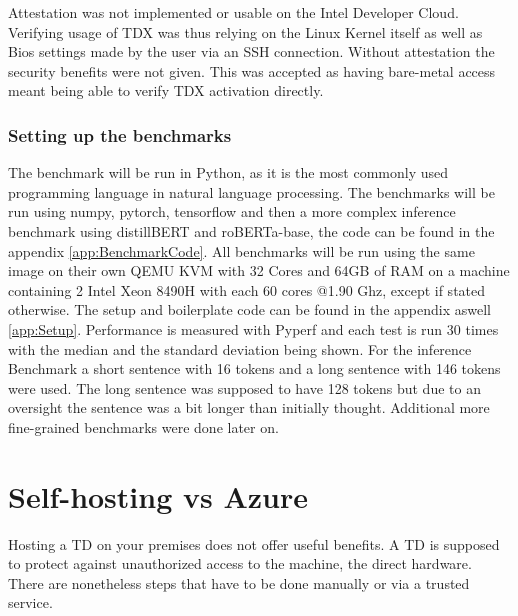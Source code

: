 Attestation was not implemented or usable on the Intel Developer Cloud. Verifying usage of TDX was thus relying on the Linux Kernel itself as well as Bios settings made by the user via an SSH connection. Without attestation the security benefits were not given. This was accepted as having bare-metal access meant being able to verify TDX activation directly.


\subsection{Setting up the benchmarks}
\label{sec:SecondContent:SecondSection}

The benchmark will be run in Python, as it is the most commonly used programming language in natural language processing. The benchmarks will be run using numpy\cite{numpyWeb}, pytorch\cite{pytorchWeb}, tensorflow\cite{tensorflowWeb} and then a more complex inference benchmark using distillBERT and roBERTa-base, the code can be found in the appendix \ref{app:BenchmarkCode}. All benchmarks will be run using the same image on their own QEMU KVM with 32 Cores and 64GB of RAM on a machine containing 2 Intel Xeon 8490H with each 60 cores @1.90 Ghz, except if stated otherwise. The setup and boilerplate code can be found in the appendix aswell \ref{app:Setup}. Performance is measured with Pyperf and each test is run 30 times with the median and the standard deviation being shown.
For the inference Benchmark a short sentence with 16 tokens and a long sentence with 146 tokens were used. The long sentence was supposed to have 128 tokens but due to an oversight the sentence was a bit longer than initially thought. Additional more fine-grained benchmarks were done later on.




\chapter{Self-hosting vs Azure}

Hosting a TD on your premises does not offer useful benefits. A TD is supposed to protect against unauthorized access to the machine, the direct hardware. There are nonetheless steps that have to be done manually or via a trusted service. 

